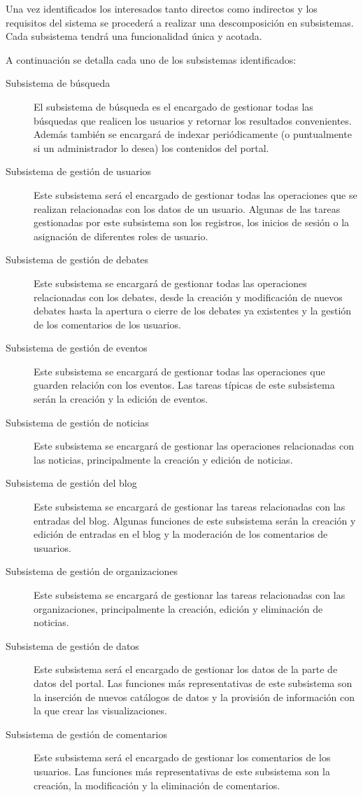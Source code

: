 Una vez identificados los interesados tanto directos como indirectos y los requisitos del sistema se procederá a realizar una descomposición en subsistemas.  Cada subsistema tendrá una funcionalidad única y acotada.

A continuación se detalla cada uno de los subsistemas identificados:

\begin{description}
\item[Subsistema de búsqueda]  El subsistema de búsqueda es el encargado de gestionar todas las búsquedas que realicen los usuarios y retornar los resultados convenientes.  Además también se encargará de indexar periódicamente (o puntualmente si un administrador lo desea) los contenidos del portal.
\item[Subsistema de gestión de usuarios]  Este subsistema será el encargado de gestionar todas las operaciones que se realizan relacionadas con los datos de un usuario.  Algunas de las tareas gestionadas por este subsistema son los registros, los inicios de sesión o la asignación de diferentes roles de usuario.
\item[Subsistema de gestión de debates]  Este subsistema se encargará de gestionar todas las operaciones relacionadas con los debates, desde la creación y modificación de nuevos debates hasta la apertura o cierre de los debates ya existentes y la gestión de los comentarios de los usuarios.
\item[Subsistema de gestión de eventos]  Este subsistema se encargará de gestionar todas las operaciones que guarden relación con los eventos.  Las tareas típicas de este subsistema serán la creación y la edición de eventos.
\item[Subsistema de gestión de noticias]  Este subsistema se encargará de gestionar las operaciones relacionadas con las noticias, principalmente la creación y edición de noticias.
\item[Subsistema de gestión del blog]  Este subsistema se encargará de gestionar las tareas relacionadas con las entradas del blog.  Algunas funciones de este subsistema serán la creación y edición de entradas en el blog y la moderación de los comentarios de usuarios.
\item[Subsistema de gestión de organizaciones]  Este subsistema se encargará de gestionar las tareas relacionadas con las organizaciones, principalmente la creación, edición y eliminación de noticias.
\item[Subsistema de gestión de datos]  Este subsistema será el encargado de gestionar los datos de la parte de datos del portal.  Las funciones más representativas de este subsistema son la inserción de nuevos catálogos de datos y la provisión de información con la que crear las visualizaciones.
\item[Subsistema de gestión de comentarios]  Este subsistema será el encargado de gestionar los comentarios de los usuarios.  Las funciones más representativas de este subsistema son la creación, la modificación y la eliminación de comentarios.
\end{description}

